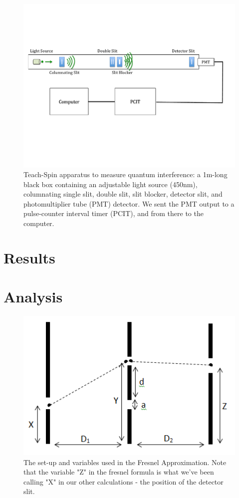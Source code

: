 \documentclass[prb,preprint]{revtex4-1}
\begin{document}
\begin{figure}[h!]
\centering
\includegraphics[width=6in]{set-up.pdf}
\caption{Teach-Spin apparatus to measure quantum interference: a 1m-long black box containing an adjustable light source (450nm), columnating single slit, double slit, slit blocker, detector slit, and photomultiplier tube (PMT) detector. We sent the PMT output to a pulse-counter interval timer (PCIT), and from there to the computer.}
\label{set-up}
\end{figure}





\section{Results}



\section{Analysis}

\begin{figure}[h!]
\centering
\includegraphics[width=6in]{fresnel_diagram.png}
\caption{The set-up and variables used in the Fresnel Approximation. Note that the variable "Z" in the fresnel formula is what we've been calling "X" in our other calculations - the position of the detector slit.}
\label{fresnel_diagram}
\end{figure}
\end{document}
